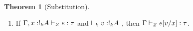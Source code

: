 \documentclass[a4paper,11pt]{article}
\theoremstyle{definition}
\newtheorem{thm}{Theorem}
\begin{document}
\begin{thm}[Substitution]
  \label{sub}
  \begin{enumerate} 
   \item If $ \Gamma,x : !_{k} A \vdash_{ Z} e : \tau $ and $
  \empty \tvdash{k} \valr : \bang{k} \ltype  $ , then  $\Gamma
  \vdash_{ Z } e[v/x]  : \tau$. 
  \end{enumerate}
\end{thm}

  

  





      
\end{document}
